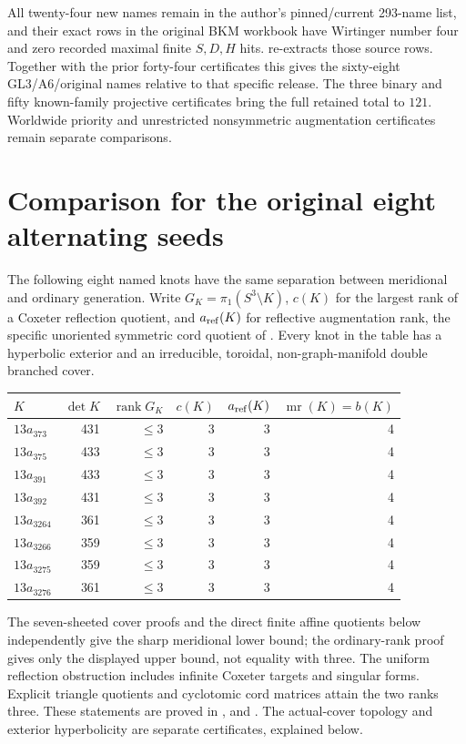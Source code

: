 \documentclass[11pt]{article}
\newcommand{\mr}{\operatorname{mr}}
\begin{document}
All twenty-four new names remain in the author's pinned/current
293-name list, and their exact rows in the original BKM workbook have
Wirtinger number four and zero recorded maximal finite $S,D,H$ hits.
 re-extracts those source rows.
Together with the prior forty-four certificates this gives the
sixty-eight GL3/A6/original names relative to that specific release.
The three binary and fifty known-family projective certificates bring
the full retained total to $121$. Worldwide
priority and unrestricted nonsymmetric augmentation certificates
remain separate comparisons.

\section{Comparison for the original eight alternating seeds}

The following eight named knots have the same separation between
meridional and ordinary generation. Write $G_K=\pi_1(S^3\setminus K)$,
$c(K)$ for the largest rank of a Coxeter reflection quotient, and
$a_{\rm ref}(K)$ for reflective augmentation rank, the specific
unoriented symmetric cord quotient of \cite{cornwell15}.
Every knot in the table has a hyperbolic exterior and an irreducible,
toroidal, non-graph-manifold double branched cover.
\begin{center}
\begin{tabular}{lrrrrr}
\hline
$K$ & $\det K$ & $\operatorname{rank}G_K$ & $c(K)$ & $a_{\rm ref}(K)$ & $\mr(K)=b(K)$\\
\hline
$13a_{373}$  &431&$\le3$&3&3&4\\
$13a_{375}$  &433&$\le3$&3&3&4\\
$13a_{391}$  &433&$\le3$&3&3&4\\
$13a_{392}$  &431&$\le3$&3&3&4\\
$13a_{3264}$ &361&$\le3$&3&3&4\\
$13a_{3266}$ &359&$\le3$&3&3&4\\
$13a_{3275}$ &359&$\le3$&3&3&4\\
$13a_{3276}$ &361&$\le3$&3&3&4\\
\hline
\end{tabular}
\end{center}
The seven-sheeted cover proofs and the direct finite affine quotients
below independently give the sharp meridional lower bound; the
ordinary-rank proof gives only the displayed upper bound, not
equality with three. The uniform reflection obstruction includes
infinite Coxeter targets and singular forms. Explicit triangle
quotients and cyclotomic cord matrices attain the two ranks three.
These statements are proved in
,
 and
.
The actual-cover topology and exterior hyperbolicity are separate
certificates, explained below.
\end{document}
